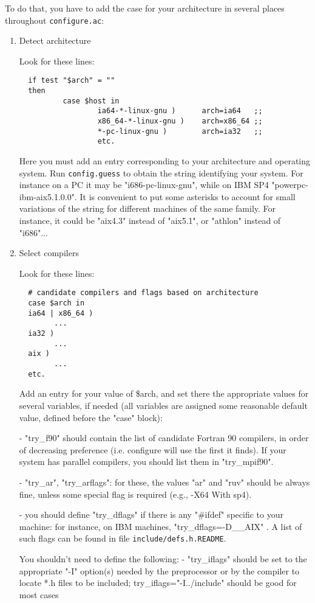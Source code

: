 \documentclass[12pt,a4paper]{article}
\def\configurac{\texttt{configure.ac}}
\begin{document}
To do that, you have to add the case for your architecture in several
places throughout \configurac:
\begin{enumerate}
\item Detect architecture

Look for these lines:
\begin{verbatim}
  if test "$arch" = ""
  then
          case $host in
                  ia64-*-linux-gnu )      arch=ia64   ;;
                  x86_64-*-linux-gnu )    arch=x86_64 ;;
                  *-pc-linux-gnu )        arch=ia32   ;;
                  etc.
\end{verbatim}
Here you must add an entry corresponding to your architecture and
operating system.  Run \texttt{config.guess} to obtain the string identifying
your system.
For instance on a PC it may be "i686-pc-linux-gnu", while on IBM SP4
"powerpc-ibm-aix5.1.0.0".  It is convenient to put some asterisks to
account for small variations of the string for different machines of
the same family.  For instance, it could be "aix4.3" instead of
"aix5.1", or "athlon" instead of "i686"...

\item  Select compilers

Look for these lines:

\begin{verbatim}
  # candidate compilers and flags based on architecture
  case $arch in
  ia64 | x86_64 )
        ...
  ia32 )
        ...
  aix )
        ...
  etc.
\end{verbatim}

Add an entry for your value of \$arch, and set there the appropriate
values for several variables, if needed (all variables are assigned
some reasonable default value, defined before the "case" block):

- "try\_f90" should contain the list of candidate Fortran 90 compilers,
in order of decreasing preference (i.e. configure will use the first
it finds).  If your system has parallel compilers, you should list
them in "try\_mpif90".

- "try\_ar", "try\_arflags": for these, the values "ar" and "ruv" should
be always fine, unless some special flag is required (e.g., -X64
With sp4).  

- you should define "try\_dflags" if there is
any
"\#ifdef" specific to your machine: for instance, on IBM machines,
"try\_dflags=-D\_\_AIX" . A list of such flags can be found in file 
\texttt{include/defs.h.README}.

You shouldn't need to define the following:
- "try\_iflags" should be set to the appropriate "-I" option(s)
needed by the preprocessor or by the compiler to locate *.h files
to be included; try\_iflags="-I../include" should be good for most cases


\end{enumerate}
\end{document}
